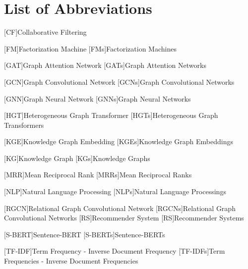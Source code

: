 \clearpage

\chapter*{List of Abbreviations}

\begin{acronym}

[CF]{Collaborative Filtering}

[FM]{Factorization Machine}
[FMs]{Factorization Machines}

[GAT]{Graph Attention Network}
[GATs]{Graph Attention Networks}

[GCN]{Graph Convolutional Network}
[GCNs]{Graph Convolutional Networks}

[GNN]{Graph Neural Network}
[GNNs]{Graph Neural Networks}

[HGT]{Heterogeneous Graph Transformer}
[HGTs]{Heterogeneous Graph Transformers}

[KGE]{Knowledge Graph Embedding}
[KGEs]{Knowledge Graph Embeddings}

[KG]{Knowledge Graph}
[KGs]{Knowledge Graphs}

[MRR]{Mean Reciprocal Rank}
[MRRs]{Mean Reciprocal Ranks}


[NLP]{Natural Language Processing}
[NLPs]{Natural Language Processings}

[RGCN]{Relational Graph Convolutional Network}
[RGCNs]{Relational Graph Convolutional Networks}
[RS]{Recommender System}
[RS]{Recommender Systems}

[S-BERT]{Sentence-BERT}
[S-BERTs]{Sentence-BERTs}

[TF-IDF]{Term Frequency - Inverse Document Frequency}
[TF-IDFs]{Term Frequencies - Inverse Document Frequencies}


\end{acronym}

